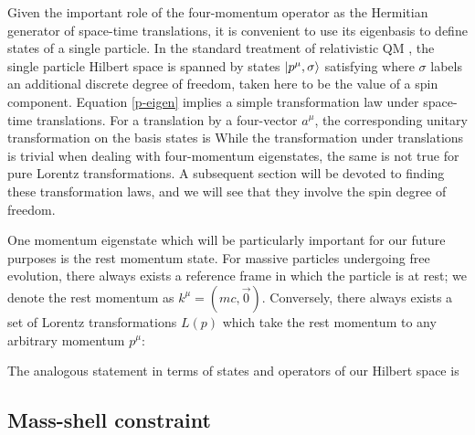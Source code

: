 \documentclass[12pt,a4paper,notitlepage]{report}
\begin{document}
Given the important role of the four-momentum operator as the Hermitian generator of space-time translations, it is convenient to use its eigenbasis to define states of a single particle. 
In the standard treatment of relativistic QM \cite{weinberg}, the single particle Hilbert space is spanned by states $\ket{p^\mu,\sigma}$ satisfying
%
%
where $\sigma$ labels an additional discrete degree of freedom, taken here to be the value of a spin component. Equation \eqref{p-eigen} implies a simple transformation law under space-time translations. For a translation by a four-vector $a^\mu$, the corresponding unitary transformation on the basis states is
%
%
While the transformation under translations is trivial when dealing with four-momentum eigenstates, the same is not true for pure Lorentz transformations. A subsequent section will be devoted to finding these transformation laws, and we will see that they involve the spin degree of freedom.

One momentum eigenstate which will be particularly important for our future purposes is the rest momentum state. For massive particles undergoing free evolution, there always exists a reference frame in which the particle is at rest; we denote the rest momentum as $k^\mu = (mc, \vec{0})$. Conversely, there always exists a set of Lorentz transformations $L(p)$ which take the rest momentum to any arbitrary momentum $p^\mu$:

%
The analogous statement in terms of states and operators of our Hilbert space is



\subsection{Mass-shell constraint}
\end{document}
